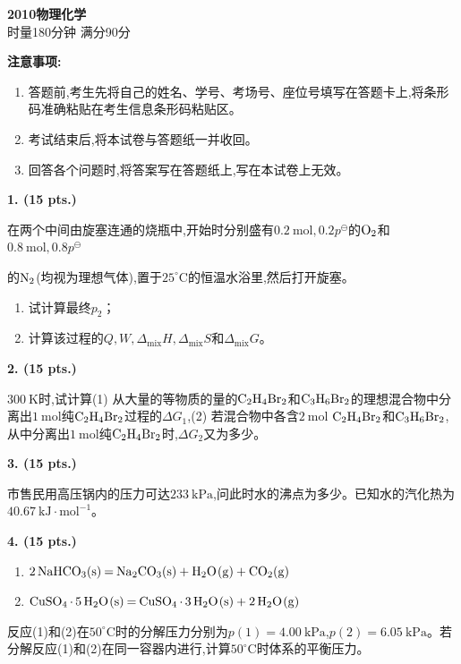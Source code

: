 \begin{center}
    {\LARGE \textbf{2010物理化学}} \\[2ex]
    {\large 时量180分钟 \quad 满分90分}
\end{center}

\vspace{0.5cm}
\noindent\textbf{注意事项:}
\begin{enumerate}[label=\arabic*., parsep=0pt, itemsep=0pt]
    \item 答题前,考生先将自己的姓名、学号、考场号、座位号填写在答题卡上,将条形码准确粘贴在考生信息条形码粘贴区。
    \item 考试结束后,将本试卷与答题纸一并收回。
    \item 回答各个问题时,将答案写在答题纸上,写在本试卷上无效。
\end{enumerate}

\vspace{0.5cm}
\noindent\textbf{1. (15 pts.)}

在两个中间由旋塞连通的烧瓶中,开始时分别盛有$0.2\ \mathrm{mol},0.2p^\ominus$的$\ce{O_{2}}$和$0.8\ \mathrm{mol},0.8p^\ominus$

的$\ce{N_{2}}$(均视为理想气体),置于$25^\circ\mathrm{C}$的恒温水浴里,然后打开旋塞。
\begin{enumerate}[label=(\arabic*), itemsep=1ex]
    \item 试计算最终$p_2$；
    \item 计算该过程的$Q,W,\Delta_\mathrm{mix}H,\Delta_\mathrm{mix}S$和$\Delta_\mathrm{mix}G$。
\end{enumerate}

\vspace{0.5cm}
\noindent\textbf{2. (15 pts.)}

$300\ \mathrm{K}$时,试计算(1) 从大量的等物质的量的$\ce{C_{2}H_{4}Br_{2}}$和$\ce{C_{3}H_{6}Br_{2}}$的理想混合物中分离出$1\ \mathrm{mol}$纯$\ce{C_{2}H_{4}Br_{2}}$过程的$\Delta G_1$,(2) 若混合物中各含$2\ \mathrm{mol}$ $\ce{C_{2}H_{4}Br_{2}}$和$\ce{C_{3}H_{6}Br_{2}}$,从中分离出$1\ \mathrm{mol}$纯$\ce{C_{2}H_{4}Br_{2}}$时,$\Delta G_2$又为多少。

\vspace{0.5cm}
\noindent\textbf{3. (15 pts.)}

市售民用高压锅内的压力可达$233\ \mathrm{kPa}$,问此时水的沸点为多少。已知水的汽化热为$40.67\ \mathrm{kJ\cdot mol^{-1}}$。

\vspace{0.5cm}
\noindent\textbf{4. (15 pts.)}

\begin{enumerate}[label=(\arabic*), itemsep=1ex]
    \item $\ce{2NaHCO_{3}(s) = Na_{2}CO_{3}(s) + H_{2}O(g) + CO_{2}(g)}$
    \item $\ce{CuSO_{4} * 5H_{2}O(s) = CuSO_{4} * 3H_{2}O(s) + 2H_{2}O(g)}$
\end{enumerate}
反应(1)和(2)在$50^\circ\mathrm{C}$时的分解压力分别为$p(1)=4.00\ \mathrm{kPa}$,$p(2)=6.05\ \mathrm{kPa}$。若分解反应(1)和(2)在同一容器内进行,计算$50^\circ\mathrm{C}$时体系的平衡压力。


